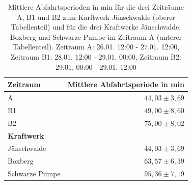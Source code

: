 \begin{table}[!ht]
	\centering
	\caption{Mittlere Abfahrtsperioden in min für die drei Zeiträume A, B1 und B2 zum Karftwerk Jänschwalde (oberer Tabellenteil) und für die drei Kraftwerke Jänschwalde, Boxberg und Schwarze Pumpe im Zeitraum A (unterer Tabellenteil). Zeitraum A: 26.01. 12:00 - 27.01. 12:00, Zeitraum B1: 28.01. 12:00 - 29.01. 00:00, Zeitraum B2: 29.01. 00:00 - 29.01. 12:00}
	\label{tab:results}
	\begin{tabular}{|l|r|}
		\hline
		\textbf{Zeitraum} & \textbf{Mittlere Abfahrtsperiode in min} \\
		\hline
		\hline
		A & $44,03 \pm 3,69$\\
		\hline
		B1 & $49,00 \pm 8,60$\\
		\hline
        B2 & $75,00 \pm 8,02$\\
		\hline
		\hline
        \textbf{Kraftwerk} & \\
		\hline
		\hline
        Jänschwalde & $44,03 \pm 3,69$\\
		\hline
        Boxberg & $63,57 \pm 6,39$\\
		\hline
		Schwarze Pumpe & $95,36 \pm 7,19$\\
		\hline
	\end{tabular}
\end{table}